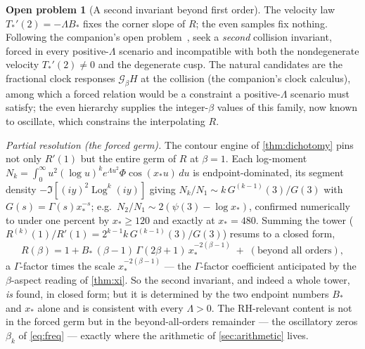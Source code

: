 \documentclass[11pt,reqno]{amsart}
\theoremstyle{plain}
\theoremstyle{definition}
\newtheorem{problem}[theorem]{Open problem}
\theoremstyle{remark}
\DeclareMathOperator{\Log}{Log}
\begin{document}
\begin{problem}[A second invariant beyond first order]
The velocity law $T_*'(2)=-\Lambda B_*$ fixes the corner slope of $R$; the
even samples fix nothing. Following the companion's open
problem~\cite{Fsymbol}, seek a \emph{second} collision invariant, forced in
every positive-$\Lambda$ scenario and incompatible with both the
nondegenerate velocity $T_*'(2)\neq0$ and the degenerate cusp. The natural
candidates are the fractional clock responses $\mathcal G_\beta H$ at the
collision (the companion's clock calculus), among which a forced relation
would be a constraint a positive-$\Lambda$ scenario must satisfy; the even
hierarchy supplies the integer-$\beta$ values of this family, now known to
oscillate, which constrains the interpolating $R$.

\smallskip\noindent\emph{Partial resolution (the forced germ).} The contour
engine of \cref{thm:dichotomy} pins not only $R'(1)$ but the entire germ of
$R$ at $\beta=1$. Each log-moment
$N_k=\int_0^\infty u^2(\log u)^k e^{\Lambda u^2}\Phi\cos(x_*u)\,du$ is
endpoint-dominated, its segment density $-\Im[(iy)^2\Log^k(iy)]$ giving
$N_k/N_1\sim k\,G^{(k-1)}(3)/G(3)$ with $G(s)=\Gamma(s)x_*^{-s}$; e.g.\
$N_2/N_1\sim2(\psi(3)-\log x_*)$, confirmed numerically to under one percent
by $x_*\ge120$ and exactly at $x_*=480$. Summing the tower
($R^{(k)}(1)/R'(1)=2^{k-1}k\,G^{(k-1)}(3)/G(3)$) resums to a closed form,
\begin{equation}\label{eq:germ}
  R(\beta)=1+B_*\,(\beta-1)\,\Gamma(2\beta+1)\,x_*^{-2(\beta-1)}
  \;+\;(\text{beyond all orders}),
\end{equation}
a $\Gamma$-factor times the scale $x_*^{-2(\beta-1)}$ --- the $\Gamma$-factor
coefficient anticipated by the $\beta$-aspect reading of \cref{thm:xi}. So the
second invariant, and indeed a whole tower, \emph{is} found, in closed form;
but it is determined by the two endpoint numbers $B_*$ and $x_*$ alone and is
consistent with every $\Lambda>0$. The RH-relevant content is not in the
forced germ but in the beyond-all-orders remainder --- the oscillatory zeros
$\beta_k$ of \eqref{eq:freq} --- exactly where the arithmetic of
\cref{sec:arithmetic} lives.
\end{problem}
\end{document}
